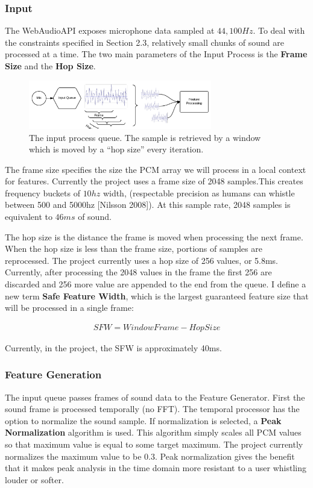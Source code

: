 \documentclass[DIV=calc, paper=a4, fontsize=11pt, twocolumn]{scrartcl}   %
\begin{document}
\subsubsection{Input}
The WebAudioAPI exposes microphone data sampled at $44,100Hz$. To deal with the constraints specified in Section 2.3, relatively small chunks of sound are processed at a time. The two main parameters of the Input Process is the \textbf{Frame Size} and the \textbf{Hop Size}.
\begin{figure}[h]
\centering
\includegraphics[width=80mm]{figures/InputDiagram.png}
\caption{The input process queue. The sample is retrieved by a window which is moved by a ``hop size'' every iteration.}
\label{overflow}
\end{figure}

The frame size specifies the size the PCM array we will process in a local context for features. Currently the project uses a frame size of 2048 samples.This creates frequency buckets of $10hz$ width, (respectable precision as humans can whistle between 500 and 5000hz [Nilsson 2008]). At this sample rate, 2048 samples is equivalent to $46ms$ of sound.
\par The hop size is the distance the frame is moved when processing the next frame. When the hop size is less than the frame size, portions of samples are reprocessed. The project currently uses a hop size of 256 values, or 5.8ms. Currently, after processing the 2048 values in the frame the first 256 are discarded and 256 more value are appended to the end from the queue. I define a new term \textbf{Safe Feature Width}, which is the largest guaranteed feature size that will be processed in a single frame:

\begin{align}
   SFW = WindowFrame - HopSize
\end{align}

Currently, in the project, the SFW is approximately 40ms.

\subsubsection{Feature Generation}

The input queue passes frames of sound data to the Feature Generator. First the sound frame is processed temporally (no FFT). The temporal processor has the option to normalize the sound sample. If normalization is selected, a \textbf{Peak Normalization} algorithm is used. This algorithm simply scales all PCM values so that maximum value is equal to some target maximum. The project currently normalizes the maximum value to be $0.3$. Peak normalization gives the benefit that it makes peak analysis in the time domain more resistant to a user whistling louder or softer.
\end{document}
